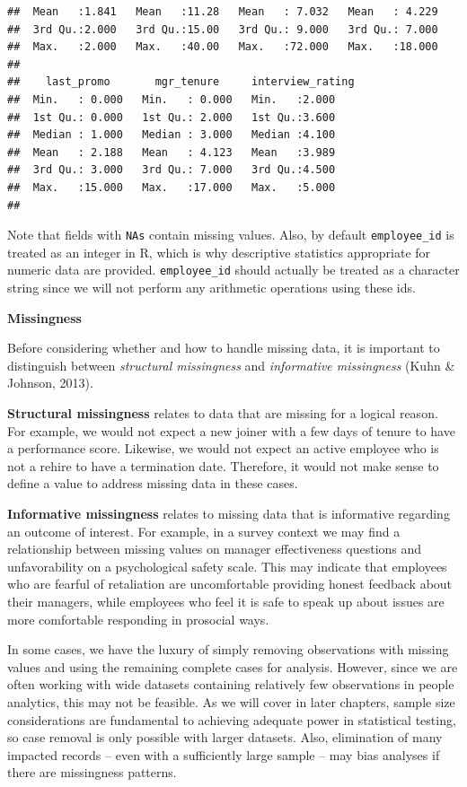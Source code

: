 \documentclass[
]{book}
\begin{document}
\begin{verbatim}
##  Mean   :1.841   Mean   :11.28   Mean   : 7.032   Mean   : 4.229  
##  3rd Qu.:2.000   3rd Qu.:15.00   3rd Qu.: 9.000   3rd Qu.: 7.000  
##  Max.   :2.000   Max.   :40.00   Max.   :72.000   Max.   :18.000  
##                                                                   
##    last_promo       mgr_tenure     interview_rating
##  Min.   : 0.000   Min.   : 0.000   Min.   :2.000   
##  1st Qu.: 0.000   1st Qu.: 2.000   1st Qu.:3.600   
##  Median : 1.000   Median : 3.000   Median :4.100   
##  Mean   : 2.188   Mean   : 4.123   Mean   :3.989   
##  3rd Qu.: 3.000   3rd Qu.: 7.000   3rd Qu.:4.500   
##  Max.   :15.000   Max.   :17.000   Max.   :5.000   
## 
\end{verbatim}

Note that fields with \texttt{NA\textquotesingle{}s} contain missing values. Also, by default \texttt{employee\_id} is treated as an integer in R, which is why descriptive statistics appropriate for numeric data are provided. \texttt{employee\_id} should actually be treated as a character string since we will not perform any arithmetic operations using these ids.

\textbf{Missingness}

Before considering whether and how to handle missing data, it is important to distinguish between \emph{structural missingness} and \emph{informative missingness} (Kuhn \& Johnson, 2013).

\textbf{Structural missingness} relates to data that are missing for a logical reason. For example, we would not expect a new joiner with a few days of tenure to have a performance score. Likewise, we would not expect an active employee who is not a rehire to have a termination date. Therefore, it would not make sense to define a value to address missing data in these cases.

\textbf{Informative missingness} relates to missing data that is informative regarding an outcome of interest. For example, in a survey context we may find a relationship between missing values on manager effectiveness questions and unfavorability on a psychological safety scale. This may indicate that employees who are fearful of retaliation are uncomfortable providing honest feedback about their managers, while employees who feel it is safe to speak up about issues are more comfortable responding in prosocial ways.

In some cases, we have the luxury of simply removing observations with missing values and using the remaining complete cases for analysis. However, since we are often working with wide datasets containing relatively few observations in people analytics, this may not be feasible. As we will cover in later chapters, sample size considerations are fundamental to achieving adequate power in statistical testing, so case removal is only possible with larger datasets. Also, elimination of many impacted records -- even with a sufficiently large sample -- may bias analyses if there are missingness patterns.
\end{document}
